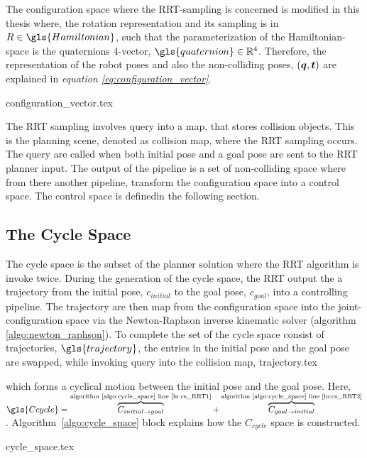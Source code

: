 The configuration space where 
the RRT-sampling is concerned is modified in this thesis where, 
the rotation representation and its sampling is in
$R \in \gls{Hamiltonian}$, such that the parameterization of
the Hamiltonian-space is the quaternions 4-vector,
$\gls{quaternion} \in \mathbb{R}^4$. Therefore, the representation of the robot poses
and also the non-colliding poses, $(\vb*{q},\vb*{t})$ 
are explained in \textit{equation \ref{eq:configuration_vector}}.

{configuration_vector.tex}

The RRT sampling involves query into a map, that stores collision objects.
This is the planning scene, denoted as collision map, where the RRT sampling occurs.
The query are
called when both initial pose and a goal pose are sent to the RRT planner input. 
The output of the pipeline is a set of non-colliding space where from there another
pipeline, transform the configuration space into a control space. The control space is 
definedin the following section.
\subsection{The Cycle Space}
The cycle space is the subset of the planner solution where the RRT algorithm is invoke
twice. 
During the generation of the cycle space,  the RRT
output the a trajectory from the
initial pose, $c_{initial}$ to the goal pose, $c_{goal}$, 
into a controlling pipeline. The trajectory
are then map from the configuration space into the joint-configuration space via
the Newton-Raphson inverse kinematic solver 
(algorithm \ref{algo:newton_raphson}). To complete 
the set of the cycle space consist of trajectories, $\gls{trajectory}$, the entries in the initial pose and the goal pose
are swapped, while invoking query into the collision map,
{trajectory.tex}

which forms a cyclical motion between the initial pose and the goal
pose. Here, 
$\gls{Ccycle} = \overbrace{ C_{initial \rightarrow goal}}^\text{algorithm \ref{algo:cycle_space} line \ref{ln:cs_RRT1}} 
              + \overbrace{C_{goal \rightarrow initial}}^\text{algorithm \ref{algo:cycle_space} line \ref{ln:cs_RRT2}}$.
Algorithm~\ref{algo:cycle_space} block explains how the $C_{cycle}$ space is constructed.

{cycle_space.tex}



